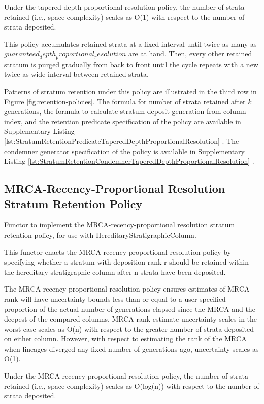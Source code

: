 Under the tapered depth-proportional resolution policy, the number of strata
retained (i.e., space complexity) scales as O(1) with respect to the number
of strata deposited.

This policy accumulates retained strata at a fixed interval until twice
as many as $guaranteed_depth_proportional_resolution$ are at hand. Then,
every other retained stratum is purged gradually from back to front
until the cycle repeats with a new twice-as-wide interval between
retained strata.

Patterns of stratum retention under this policy are illustrated in the third row in Figure \ref{fig:retention-policies}.
The formula for number of strata retained after $k$ generations, the formula to calculate stratum deposit generation from column index, and the retention predicate specification of the policy are available in Supplementary Listing \ref{lst:StratumRetentionPredicateTaperedDepthProportionalResolution} \citep{moreno2022hstratconceptsupplement}.
The condemner generator specification of the policy is available in Supplementary Listing \ref{lst:StratumRetentionCondemnerTaperedDepthProportionalResolution} \citep{moreno2022hstratconceptsupplement}.

\subsection{MRCA-Recency-Proportional Resolution Stratum Retention Policy}

Functor to implement the MRCA-recency-proportional resolution stratum
retention policy, for use with HereditaryStratigraphicColumn.

This functor enacts the MRCA-recency-proportional resolution policy by
specifying whether a stratum with deposition rank r should be retained
within the hereditary stratigraphic column after n strata have been
deposited.

The MRCA-recency-proportional resolution policy ensures estimates of MRCA
rank will have uncertainty bounds less than or equal to a user-specified
proportion of the actual number of generations elapsed since the MRCA and
the deepest of the compared columns. MRCA rank estimate uncertainty scales
in the worst case scales as O(n) with respect to the greater number of
strata deposited on either column. However, with respect to estimating the rank of the MRCA when lineages diverged any fixed number of generations ago,
uncertainty scales as O(1).

Under the MRCA-recency-proportional resolution policy, the number of strata
retained (i.e., space complexity) scales as O(log(n)) with respect to the
number of strata deposited.

